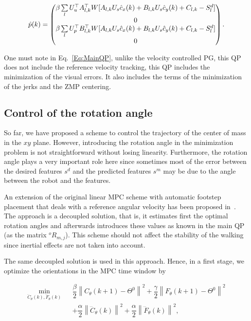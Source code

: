 \begin{equation*}
 \hat{p}(k) = 
 \left(
 \begin{matrix}
 \beta  \sum\limits_l U_{u}^{\top} A_{l,k}^{\top} W [A_{l,k} U_{s} \hat{c}_x(k) + B_{l,k} U_{s} \hat{c}_y(k) + C_{l,k} - S^d_l]\\
 0 \\
 \beta  \sum\limits_l U_{p}^{\top} B_{l,k}^{\top} W [A_{l,k} U_{s} \hat{c}_x(k) + B_{l,k} U_{s} \hat{c}_y(k) + C_{l,k} - S^d_l ]\\
 0
 \end{matrix}
 \right).
\end{equation*}

One must note in Eq.~\ref{Eq:MainQP}, unlike the velocity controlled PG, this QP does not include the reference velocity tracking, this QP includes the minimization of the visual errors. It also includes the terms of the minimization of the jerks and the ZMP centering.

\subsection{Control of the rotation angle}
\label{subsection:control_of_the_rotation_angle}

So far, we have proposed a scheme to control the trajectory of the center of mass in the $xy$ plane. However, introducing the rotation angle in the minimization problem is not straightforward without losing linearity. Furthermore, the rotation angle plays a very important role here since sometimes most of the error between the desired features $s^d$ and the predicted features $s^m$ may be due to the angle between the robot and the features.

An extension of the original linear MPC scheme with automatic footstep placement that deals with a reference angular velocity has been proposed in~\citep{HerdtIROS2010}. The approach is a decoupled solution, that is, it estimates first the optimal rotation angles and afterwards introduces these values as known in the main QP (as the matrix ${^o R_{m,j}}$). This scheme should not affect the stability of the walking since inertial effects are not taken into account.

The same decoupled solution is used in this approach. Hence, in a first stage, we optimize the orientations in the MPC time window by  

{\small
\begin{eqnarray}
 \min\limits_{\dddot{C}_{\theta}(k),\dddot{F}_{\theta}(k) }  &&  \dfrac{\beta}{2} \left\| C_{\theta}(k+1) - \Theta^{0} \right\|^2 + \dfrac{\gamma}{2} \left\| F_{\theta}(k+1) - \Theta^{0} \right\|^2 \\
\nonumber && + \dfrac{\alpha}{2} \left\| \dddot{C}_{\theta}(k) \right\|^2 + \dfrac{\alpha}{2} \left\| \dddot{F}_{\theta}(k) \right\|^2,
\end{eqnarray}
}

